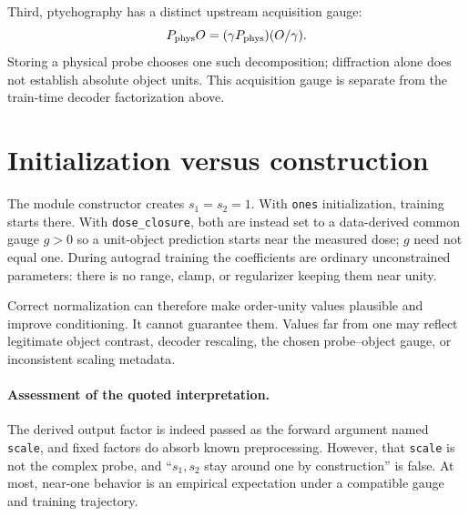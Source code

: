\documentclass[10pt]{article}
\begin{document}
Third, ptychography has a distinct upstream acquisition gauge:
\begin{equation}
  P_{\rm phys}O=(\gamma P_{\rm phys})(O/\gamma).
\end{equation}
Storing a physical probe chooses one such decomposition; diffraction alone
does not establish absolute object units. This acquisition gauge is separate
from the train-time decoder factorization above.

\section*{Initialization versus construction}

The module constructor creates $s_1=s_2=1$. With \texttt{ones}
initialization, training starts there. With \texttt{dose\_closure}, both are
instead set to a data-derived common gauge $g>0$ so a unit-object prediction
starts near the measured dose; $g$ need not equal one. During autograd training
the coefficients are ordinary unconstrained parameters: there is no range,
clamp, or regularizer keeping them near unity.

Correct normalization can therefore make order-unity values plausible and
improve conditioning. It cannot guarantee them. Values far from one may
reflect legitimate object contrast, decoder rescaling, the chosen
probe--object gauge, or inconsistent scaling metadata.

\paragraph{Assessment of the quoted interpretation.}
The derived output factor is indeed passed as the forward argument named
\texttt{scale}, and fixed factors do absorb known preprocessing. However,
that \texttt{scale} is not the complex probe, and ``$s_1,s_2$ stay around one
by construction'' is false. At most, near-one behavior is an empirical
expectation under a compatible gauge and training trajectory.
\end{document}
